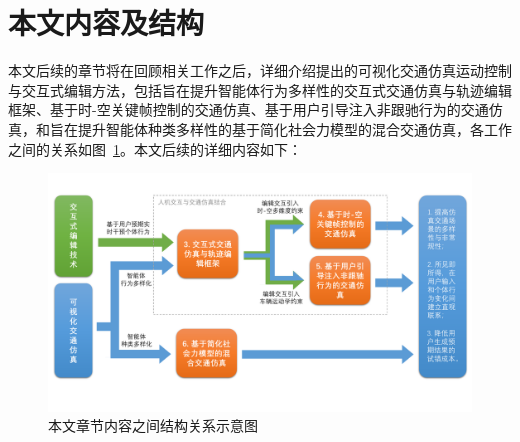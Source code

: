 \section{本文内容及结构}





本文后续的章节将在回顾相关工作之后，详细介绍提出的可视化交通仿真运动控制与交互式编辑方法，包括旨在提升智能体行为多样性的交互式交通仿真与轨迹编辑框架、基于时-空关键帧控制的交通仿真、基于用户引导注入非跟驰行为的交通仿真，和旨在提升智能体种类多样性的基于简化社会力模型的混合交通仿真，各工作之间的关系如图~\ref{fig:intro_overview}。本文后续的详细内容如下：

\begin{figure}[!htb]
\centering
\includegraphics[width=\textwidth]{figure/intro/tot_overview_v4.pdf}
\caption[本文章节内容之间结构关系示意图]{
本文章节内容之间结构关系示意图
}
\label{fig:intro_overview}
\end{figure}

